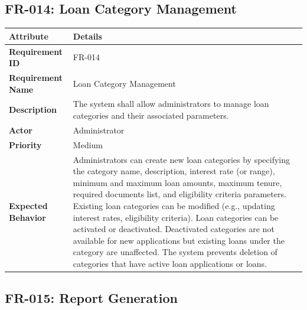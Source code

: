 \documentclass[12pt,a4paper,oneside]{report}
\begin{document}
\subsection{FR-014: Loan Category Management}

\begin{table}[htbp]
\centering
\small
\begin{tabularx}{\textwidth}{l l}
\toprule
\textbf{Attribute} & \textbf{Details} \\
\midrule
\textbf{Requirement ID} & FR-014 \\
\textbf{Requirement Name} & Loan Category Management \\
\textbf{Description} & The system shall allow administrators to manage loan categories and their associated parameters. \\
\textbf{Actor} & Administrator \\
\textbf{Priority} & Medium \\
\textbf{Expected Behavior} & Administrators can create new loan categories by specifying the category name, description, interest rate (or range), minimum and maximum loan amounts, maximum tenure, required documents list, and eligibility criteria parameters. Existing loan categories can be modified (e.g., updating interest rates, eligibility criteria). Loan categories can be activated or deactivated. Deactivated categories are not available for new applications but existing loans under the category are unaffected. The system prevents deletion of categories that have active loan applications or loans. \\
\bottomrule
\end{tabularx}
\end{table}

\subsection{FR-015: Report Generation}
\end{document}
